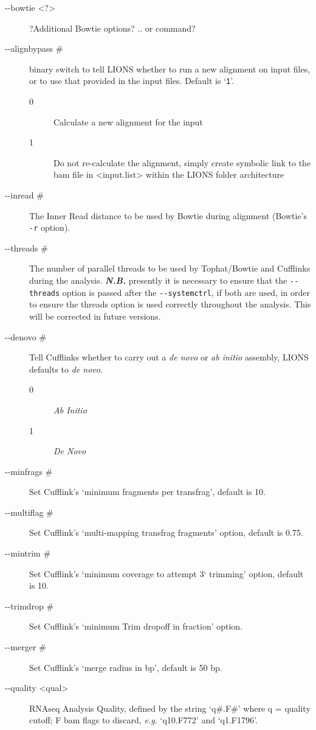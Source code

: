 \documentclass[11pt]{scrartcl}
\begin{document}
\begin{description}
\item[-{}-bowtie <?>] ?Additional Bowtie options? .. or command?

\item[-{}-alignbypass \#] binary switch to tell LIONS whether to run a new alignment on input files, or to use that provided in the input files. Default is `\texttt{1}'.
       \begin{description}
	\item[0] Calculate a new alignment for the input
	\item[1] Do not re-calculate the alignment, simply create symbolic link to the bam file in <input.list> within the LIONS folder architecture
       \end{description}

\item[-{}-inread \#]  The Inner Read distance to be used by Bowtie during alignment (Bowtie's \texttt{-r} option). 

\item[-{}-threads \#] The number of parallel threads to be used by Tophat/Bowtie and Cufflinks during the analysis. \textbf{\textit{N.B.}} presently it is necessary to ensure that the \texttt{-{}-threads} option is passed after the \texttt{-{}-systemctrl}, if both are used, in order to ensure the threads option is used correctly throughout the analysis. This will be corrected in future versions.

\item[-{}-denovo \#] Tell Cufflinks whether to carry out a \textit{de novo} or \textit{ab initio} assembly, LIONS defaults to \textit{de novo}.
	\begin{description}
        \item[0] \textit{Ab Initio}
        \item[1] \textit{De Novo}
        \end{description}

\item[-{}-minfrags \#] Set Cufflink's `minimum fragments per transfrag', default is 10.
\item[-{}-multiflag \#] Set Cufflink's `multi-mapping transfrag fragments' option, default is 0.75.
\item[-{}-mintrim \#] Set Cufflink's `minimum coverage to attempt 3` trimming' option, default is 10.
\item[-{}-trimdrop \#] Set Cufflink's `minimum Trim dropoff in fraction' option.
\item[-{}-merger \#] Set Cufflink's `merge radius in bp', default is 50 bp.
	


\item[-{}-quality <qual>] RNAseq Analysis Quality, defined by the string `q\#.F\#' where  q = quality cutoff; F bam flags to discard, \textit{e.g.} `q10.F772' and `q1.F1796'. 


\end{description}
\end{document}
